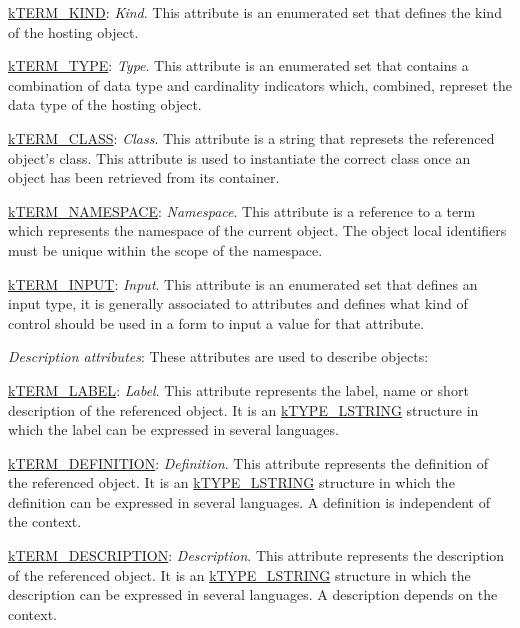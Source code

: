 \begin{DoxyItemize}
\begin{DoxyItemize}
\item {\ttfamily \hyperlink{}{k\-T\-E\-R\-M\-\_\-\-K\-I\-N\-D}}\-: {\itshape Kind}. This attribute is an enumerated set that defines the kind of the hosting object. 
\item {\ttfamily \hyperlink{}{k\-T\-E\-R\-M\-\_\-\-T\-Y\-P\-E}}\-: {\itshape Type}. This attribute is an enumerated set that contains a combination of data type and cardinality indicators which, combined, represet the data type of the hosting object. 
\item {\ttfamily \hyperlink{}{k\-T\-E\-R\-M\-\_\-\-C\-L\-A\-S\-S}}\-: {\itshape Class}. This attribute is a string that represets the referenced object's class. This attribute is used to instantiate the correct class once an object has been retrieved from its container. 
\item {\ttfamily \hyperlink{}{k\-T\-E\-R\-M\-\_\-\-N\-A\-M\-E\-S\-P\-A\-C\-E}}\-: {\itshape Namespace}. This attribute is a reference to a term which represents the namespace of the current object. The object local identifiers must be unique within the scope of the namespace. 
\item {\ttfamily \hyperlink{}{k\-T\-E\-R\-M\-\_\-\-I\-N\-P\-U\-T}}\-: {\itshape Input}. This attribute is an enumerated set that defines an input type, it is generally associated to attributes and defines what kind of control should be used in a form to input a value for that attribute. 
\end{DoxyItemize}
\item {\itshape Description attributes}\-: These attributes are used to describe objects\-: 
\begin{DoxyItemize}
\item {\ttfamily \hyperlink{}{k\-T\-E\-R\-M\-\_\-\-L\-A\-B\-E\-L}}\-: {\itshape Label}. This attribute represents the label, name or short description of the referenced object. It is an \hyperlink{}{k\-T\-Y\-P\-E\-\_\-\-L\-S\-T\-R\-I\-N\-G} structure in which the label can be expressed in several languages. 
\item {\ttfamily \hyperlink{}{k\-T\-E\-R\-M\-\_\-\-D\-E\-F\-I\-N\-I\-T\-I\-O\-N}}\-: {\itshape Definition}. This attribute represents the definition of the referenced object. It is an \hyperlink{}{k\-T\-Y\-P\-E\-\_\-\-L\-S\-T\-R\-I\-N\-G} structure in which the definition can be expressed in several languages. A definition is independent of the context. 
\item {\ttfamily \hyperlink{}{k\-T\-E\-R\-M\-\_\-\-D\-E\-S\-C\-R\-I\-P\-T\-I\-O\-N}}\-: {\itshape Description}. This attribute represents the description of the referenced object. It is an \hyperlink{}{k\-T\-Y\-P\-E\-\_\-\-L\-S\-T\-R\-I\-N\-G} structure in which the description can be expressed in several languages. A description depends on the context. 

\end{DoxyItemize}
\end{DoxyItemize}
